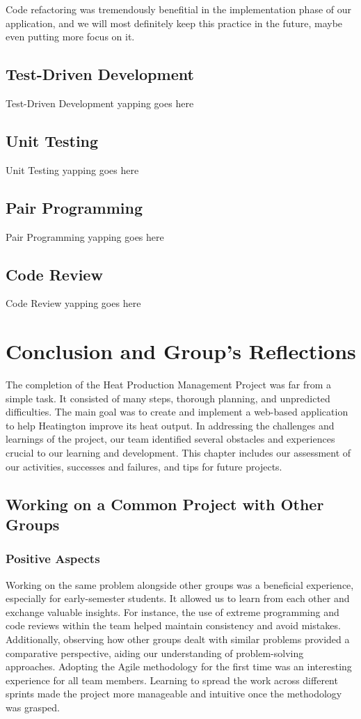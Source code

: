 \documentclass[12pt]{report}
\begin{document}
Code refactoring was tremendously benefitial in the implementation phase of our application, and we will most definitely
keep this practice in the future, maybe even putting more focus on it.

\section{Test-Driven Development}
Test-Driven Development yapping goes here

\section{Unit Testing}
Unit Testing yapping goes here

\section{Pair Programming}
Pair Programming yapping goes here

\section{Code Review}
Code Review yapping goes here

\chapter{Conclusion and Group's Reflections}

The completion of the Heat Production Management Project was far from a simple task. 
It consisted of many steps, thorough planning, and unpredicted difficulties. The main goal was to create and implement
 a web-based application to help Heatington improve its heat output. In addressing the challenges and 
 learnings of the project, our team identified several obstacles and experiences crucial to our learning and development. 
 This chapter includes our assessment of our activities, successes and failures, and tips for future projects.

\section{Working on a Common Project with Other Groups}

\subsection*{Positive Aspects}
Working on the same problem alongside other groups was a beneficial experience, especially for early-semester students.
It allowed us to learn from each other and exchange valuable insights. For instance, the use of extreme 
programming and code reviews within the team helped maintain consistency and avoid mistakes. Additionally, observing 
how other groups dealt with similar problems provided a comparative perspective, aiding our understanding of 
problem-solving approaches. Adopting the Agile methodology for the first time was an interesting experience for all 
team members. Learning to spread the work across different sprints made the project more manageable and intuitive 
once the methodology was grasped.
\end{document}
